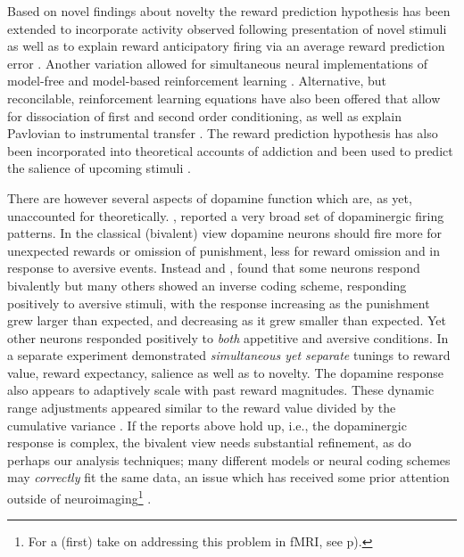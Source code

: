 Based on novel findings about novelty \citep{Bunzeck:2006p5319, Blatter:2006p6372, GuitartMasip:2010p7244} the reward prediction hypothesis has been extended to incorporate activity observed following presentation of novel stimuli \citep{Kakade:2002p6414} as well as to explain reward anticipatory firing via an average reward prediction error \citep{Knutson:2007p1687}. Another variation allowed for simultaneous neural implementations of model-free and model-based reinforcement learning \citep{Smith:2006p7627, Daw:2011p7995}. Alternative, but reconcilable, reinforcement learning equations have also been offered that allow for dissociation of first and second order conditioning, as well as explain Pavlovian to instrumental transfer \citep{OReilly:2007p827}. The reward prediction hypothesis has also been incorporated into theoretical accounts of addiction \citep{Redish:2004p2531} and been used to predict the salience of upcoming stimuli \citep{Behrens:2007p8839}.   

There are however several aspects of dopamine function which are, as yet, unaccounted for theoretically.  \citet{Matsumoto:2009p7219}, reported a very broad set of dopaminergic firing patterns. In the classical (bivalent) view dopamine neurons should fire more for unexpected rewards or omission of punishment, less for reward omission and in response to aversive events.   Instead \citet{Kim:2006p1063} and \citet{Matsumoto:2009p7219}, found that some neurons respond bivalently but many others showed an inverse coding scheme, responding positively to aversive stimuli, with the response increasing as the punishment grew larger than expected, and decreasing as it grew smaller than expected.  Yet other neurons responded positively to \emph{both} appetitive and aversive conditions.  In a separate experiment \citet{Smith:2011p8133} demonstrated \emph{simultaneous yet separate} tunings to reward value, reward expectancy, salience as well as to novelty.   The dopamine response also appears to adaptively scale with past reward magnitudes.  These dynamic range adjustments appeared similar to the reward value divided by the cumulative variance \citep{Tobler:2005p6373}.  If the reports above hold up, i.e., the dopaminergic response is complex, the bivalent view needs substantial refinement, as do perhaps our analysis techniques; many different models or neural coding schemes may \emph{correctly} fit the same data, an issue which has received some prior attention outside of neuroimaging\footnote{
    For a (first) take on addressing this problem in fMRI, see p\pageref{subsub:tomany}).
} \citep{Chamberlin:1965p8873}.

